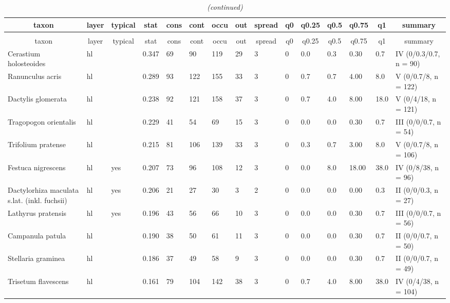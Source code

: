 \documentclass[9pt]{article}
\begin{document}
\newpage
\setlongtables\begin{longtable}{lllllllllllllll}\caption{Partion summary for cluster 2 consisting out of 131 plots.} \tabularnewline
\toprule
\multicolumn{1}{c}{taxon}&\multicolumn{1}{c}{layer}&\multicolumn{1}{c}{typical}&\multicolumn{1}{c}{stat}&\multicolumn{1}{c}{cons}&\multicolumn{1}{c}{cont}&\multicolumn{1}{c}{occu}&\multicolumn{1}{c}{out}&\multicolumn{1}{c}{spread}&\multicolumn{1}{c}{q0}&\multicolumn{1}{c}{q0.25}&\multicolumn{1}{c}{q0.5}&\multicolumn{1}{c}{q0.75}&\multicolumn{1}{c}{q1}&\multicolumn{1}{c}{summary}\tabularnewline
\midrule
\endfirsthead\caption[]{\em (continued)} \tabularnewline
\midrule
\multicolumn{1}{c}{taxon}&\multicolumn{1}{c}{layer}&\multicolumn{1}{c}{typical}&\multicolumn{1}{c}{stat}&\multicolumn{1}{c}{cons}&\multicolumn{1}{c}{cont}&\multicolumn{1}{c}{occu}&\multicolumn{1}{c}{out}&\multicolumn{1}{c}{spread}&\multicolumn{1}{c}{q0}&\multicolumn{1}{c}{q0.25}&\multicolumn{1}{c}{q0.5}&\multicolumn{1}{c}{q0.75}&\multicolumn{1}{c}{q1}&\multicolumn{1}{c}{summary}\tabularnewline
\midrule
\endhead
\midrule
\endfoot
\label{as.matrix}
Cerastium holosteoides&hl&&0.347&69& 90&119&29&3&0&0.0&0.3& 0.30& 0.7&IV (0/0.3/0.7, n = 90)\tabularnewline
Ranunculus acris&hl&&0.289&93&122&155&33&3&0&0.7&0.7& 4.00& 8.0&V (0/0.7/8, n = 122)\tabularnewline
Dactylis glomerata&hl&&0.238&92&121&158&37&3&0&0.7&4.0& 8.00&18.0&V (0/4/18, n = 121)\tabularnewline
Tragopogon orientalis&hl&&0.229&41& 54& 69&15&3&0&0.0&0.0& 0.30& 0.7&III (0/0/0.7, n = 54)\tabularnewline
Trifolium pratense&hl&&0.215&81&106&139&33&3&0&0.3&0.7& 3.00& 8.0&V (0/0.7/8, n = 106)\tabularnewline
Festuca nigrescens&hl&yes&0.207&73& 96&108&12&3&0&0.0&8.0&18.00&38.0&IV (0/8/38, n = 96)\tabularnewline
Dactylorhiza maculata s.lat. (inkl. fuchsii)&hl&yes&0.206&21& 27& 30& 3&2&0&0.0&0.0& 0.00& 0.3&II (0/0/0.3, n = 27)\tabularnewline
Lathyrus pratensis&hl&yes&0.196&43& 56& 66&10&3&0&0.0&0.0& 0.30& 0.7&III (0/0/0.7, n = 56)\tabularnewline
Campanula patula&hl&&0.190&38& 50& 61&11&3&0&0.0&0.0& 0.30& 0.7&II (0/0/0.7, n = 50)\tabularnewline
Stellaria graminea&hl&&0.186&37& 49& 58& 9&3&0&0.0&0.0& 0.30& 0.7&II (0/0/0.7, n = 49)\tabularnewline
Trisetum flavescens&hl&&0.161&79&104&142&38&3&0&0.7&4.0& 8.00&38.0&IV (0/4/38, n = 104)\tabularnewline

\end{longtable}
\end{document}
